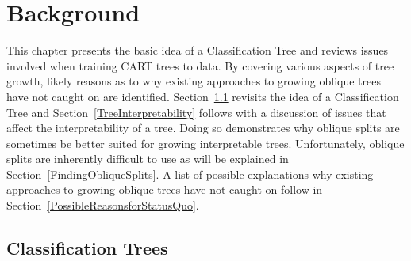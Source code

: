 \chapter{Background}
\label{Background}
This chapter presents the basic idea of a Classification Tree and reviews issues involved when training CART trees to data. By covering various aspects of tree growth, likely reasons as to why existing approaches to growing oblique trees have not caught on are identified. Section~\ref{ClassificationTrees} revisits the idea of a Classification Tree and Section~\ref{TreeInterpretability} follows with a discussion of issues that affect the interpretability of a tree. Doing so demonstrates why oblique splits are sometimes be better suited for growing interpretable trees. Unfortunately, oblique splits are inherently difficult to use as will be explained in Section~\ref{FindingObliqueSplits}. A list of possible explanations why existing approaches to growing oblique trees have not caught on follow in Section~\ref{PossibleReasonsforStatusQuo}.

\section{Classification Trees}
\label{ClassificationTrees}

